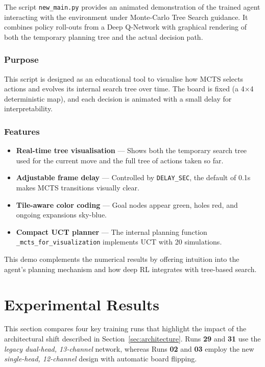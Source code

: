 \documentclass{report}
\begin{document}
The script \texttt{new\_main.py} provides an animated demonstration of the trained agent interacting with the environment under Monte-Carlo Tree Search guidance. It combines policy roll-outs from a Deep Q-Network with graphical rendering of both the temporary planning tree and the actual decision path.

\subsubsection*{Purpose}
This script is designed as an educational tool to visualise how MCTS selects actions and evolves its internal search tree over time. The board is fixed (a 4×4 deterministic map), and each decision is animated with a small delay for interpretability.

\subsubsection*{Features}
\begin{itemize}
  \item \textbf{Real-time tree visualisation} — Shows both the temporary search tree used for the current move and the full tree of actions taken so far.
  \item \textbf{Adjustable frame delay} — Controlled by \texttt{DELAY\_SEC}, the default of 0.1s makes MCTS transitions visually clear.
  \item \textbf{Tile-aware color coding} — Goal nodes appear green, holes red, and ongoing expansions sky-blue.
  \item \textbf{Compact UCT planner} — The internal planning function \texttt{\_mcts\_for\_visualization} implements UCT with 20 simulations.
\end{itemize}

\noindent This demo complements the numerical results by offering intuition into the agent’s planning mechanism and how deep RL integrates with tree-based search.

\newpage

\section{Experimental Results}
\label{sec:results}

This section compares four key training runs that highlight the impact of the
architectural shift described in Section~\ref{sec:architecture}.  
Runs \textbf{29} and \textbf{31} use the \emph{legacy dual-head, 13-channel}
network, whereas Runs \textbf{02} and \textbf{03} employ the new
\emph{single-head, 12-channel} design with automatic board flipping.
\end{document}
